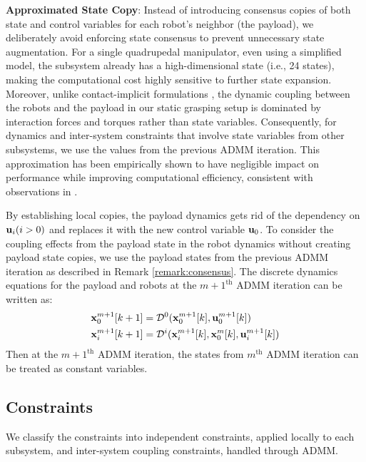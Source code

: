 \begin{remark}\label{remark:consensus}
\textbf{Approximated State Copy}: Instead of introducing consensus copies of both state and control variables for each robot’s neighbor (the payload), we deliberately avoid enforcing state consensus to prevent unnecessary state augmentation. For a single quadrupedal manipulator, even using a simplified model, the subsystem already has a high-dimensional state (i.e., 24 states), making the computational cost highly sensitive to further state expansion. Moreover, unlike contact-implicit formulations \cite{shorinwa_disco_2024}, the dynamic coupling between the robots and the payload in our static grasping setup is dominated by interaction forces and torques rather than state variables. Consequently, for dynamics and inter-system constraints that involve state variables from other subsystems, we use the values from the previous ADMM iteration. This approximation has been empirically shown to have negligible impact on performance while improving computational efficiency, consistent with observations in \cite{amatucci2022}.
\end{remark}
By establishing local copies, the payload dynamics gets rid of the dependency on $\mathbf{u}_i (i > 0)$ and replaces it with the new control variable $\mathbf{u}_0$. To consider the coupling effects from the payload state in the robot dynamics without creating payload state copies, we use the payload states from the previous ADMM iteration as described in Remark \ref{remark:consensus}. The discrete dynamics equations for the payload and robots at the $m+1^{\text{th}}$ ADMM iteration can be written as:
\begin{subequations}
    \begin{align}
        & \mathbf{x}_{0}^{m+1}[k+1] = \mathcal{D}^0(\mathbf{x}_{0}^{m+1}[k], \mathbf{u}_{0}^{m+1}[k])\\
        & \mathbf{x}_{i}^{m+1}[k+1] = \mathcal{D}^i(\mathbf{x}_{i}^{m+1}[k], \mathbf{x}_{0}^{m}[k], \mathbf{u}_{i}^{m+1}[k])
    \end{align}
\end{subequations}
Then at the $m+1^{\text{th}}$ ADMM iteration, the states from $m^{\text{th}}$ ADMM iteration can be treated as constant variables. 

\subsection{Constraints}
We classify the constraints into independent constraints, applied locally to each subsystem, and inter-system coupling constraints, handled through ADMM.

